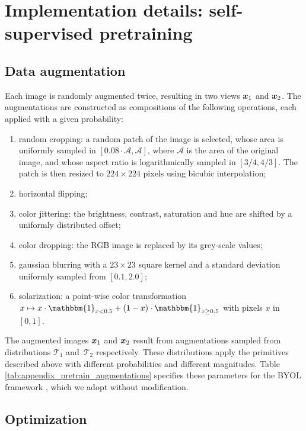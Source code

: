 \documentclass{article}
\begin{document}
\section{Implementation details: self-supervised pretraining}

\subsection{Data augmentation}
\label{sec:app-ssl-data}

 Each image is randomly augmented twice, resulting in two views ${\bm{x}}_1$ and ${\bm{x}}_2$. The augmentations are constructed as compositions of the following operations, each applied with a given probability:
\begin{enumerate}
\item random cropping: a random patch of the image is selected, whose area is uniformly sampled in $[0.08 \cdot \mathcal{A}, \mathcal{A}]$, where $\mathcal{A}$ is the area of the original image, and whose aspect ratio is logarithmically sampled in $[3/4, 4/3]$. The patch is then resized to $224 \times 224$ pixels using bicubic interpolation;
\item horizontal flipping;
\item color jittering: the brightness, contrast, saturation and hue are shifted by a uniformly distributed offset;
\item color dropping: the RGB image is replaced by its grey-scale values;
\item gaussian blurring with a $23\times 23$ square kernel and a standard deviation uniformly sampled from $[0.1, 2.0]$;
\item solarization: a point-wise color transformation $x \mapsto x \cdot \mathbbm{1}_{x < 0.5} + (1 - x) \cdot \mathbbm{1}_{x \ge 0.5}$ with pixels $x$ in $[0, 1]$.
\end{enumerate}
\noindent The augmented images ${\bm{x}}_1$ and ${\bm{x}}_2$ result from augmentations sampled from distributions $\mathcal{T}_1$ and~$\mathcal{T}_2$ respectively. These distributions apply the primitives described above with different probabilities and different magnitudes. Table \ref{tab:appendix_pretrain_augmentations} specifies these parameters for the BYOL framework \cite{grill2020bootstrap}, which we adopt without modification. 




\subsection{Optimization}
\label{sec:app-ssl-optimization}
\end{document}
